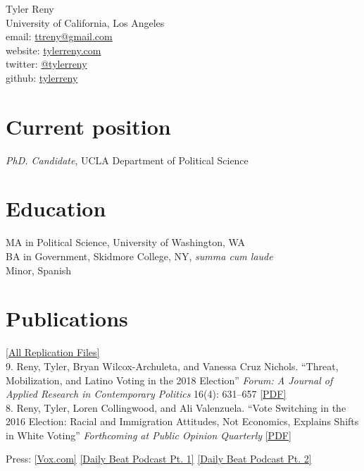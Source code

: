 \documentclass[11pt, a4paper]{article}
\newcommand{\years}[1]{\marginnote{\scriptsize #1}}
\begin{document}
{\LARGE Tyler Reny}\\[1cm]
 University of California, Los Angeles\\
email: \href{mailto:ttreny@gmail.com}{ttreny@gmail.com}\\
website: \href{http://www.tylerreny.com}{tylerreny.com}\\ 
twitter: \href{http://www.twitter.com/tylerreny}{@tylerreny}\\ 
github: \href{https://github.com/tylerreny}{tylerreny}\\ 

\section*{Current position}
\emph{PhD. Candidate}, UCLA Department of Political Science

\section*{Education}
\years{2015}\textsc{MA} in Political Science, University of Washington, WA\\
\years{2011}\textsc{BA} in Government, Skidmore College, NY, \textit{summa cum laude}\\
Minor, Spanish

\section*{Publications}
\href{https://dataverse.harvard.edu/dataverse/tylerreny}{[All Replication Files]}\\

\years{2019} 9. Reny, Tyler, Bryan Wilcox-Archuleta, and Vanessa Cruz Nichols. ``Threat, Mobilization, and Latino Voting in the 2018 Election''  \textit{Forum: A Journal of Applied Research in Contemporary Politics} 16(4): 631–657 \href{http://tylerreny.github.io/pdf/pubs/reny_wilcox_cruz_nichols2019.pdf}{[PDF]} \\

\years{2018} 8. Reny, Tyler, Loren Collingwood, and Ali Valenzuela. ``Vote Switching in the 2016 Election: Racial and Immigration Attitudes, Not Economics, Explains Shifts in White Voting''  \textit{Forthcoming at Public Opinion Quarterly} \href{http://tylerreny.github.io/pdf/pubs/final_submission_reny_etal_poq_public.pdf}{[PDF]} 

Press: \href{https://www.vox.com/policy-and-politics/2018/10/16/17980820/trump-obama-2016-race-racism-class-economy-2018-midterm}{[Vox.com]} \href{http://www.btrtoday.com/listen/thedailybeat/vote-switching-in-the-2016-election-with-tyler-reny-part-1/}{[Daily Beat Podcast Pt. 1]} \href{http://www.btrtoday.com/listen/thedailybeat/vote-switching-white-economic-anxiety-more-with-tyler-reny-part2/}{[Daily Beat Podcast Pt. 2]}\\
\end{document}
